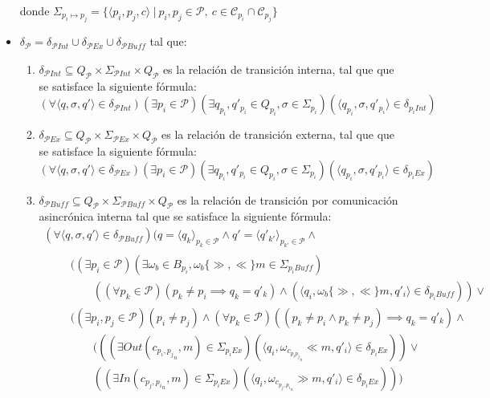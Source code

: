 \begin{definition}[Composición]
\begin{itemize}
donde $\Sigma_\mathit{p_i \mapsto p_j} =\{ \langle p_i,p_j,c \rangle \ | \ p_i, p_j \in \mathcal{P}, \  c \in \mathcal{C}_{p_i} \cap \mathcal{C}_{p_j}\}$
\item $\delta_{\mathcal{P}} = \delta_{\mathcal{P}\mathit{Int}} \cup \delta_{\mathcal{P}\mathit{Ex}} \cup \delta_{\mathcal{P}\mathit{Buff}}$ tal que:
\begin{enumerate}
\item $\delta_{\mathcal{P}\mathit{Int}} \subseteq Q_{\mathcal{P}} \times \Sigma_{\mathcal{P} Int} \times Q_{\mathcal{P}}$  es la relación de transición interna, tal que que se satisface la siguiente fórmula:
$$(\forall \langle q, \sigma, q' \rangle \in \delta_{\mathcal{P}\mathit{Int}})(\exists p_i \in \mathcal{P})(\exists q_{p_i}, q'_{p_i} \in Q_{p_i}, \sigma \in \Sigma_{p_i})(\langle q_{p_i}, \sigma, q'_{p_i} \rangle \in \delta_{p_i Int})$$

\item $\delta_{\mathcal{P}\mathit{Ex}} \subseteq Q_{\mathcal{P}} \times \Sigma_{\mathcal{P}\mathit{Ex}} \times Q_{\mathcal{P}}$ es la relación de transición externa, tal que que se satisface la siguiente fórmula: $$(\forall \langle q, \sigma, q' \rangle \in \delta_{\mathcal{P}\mathit{Ex}}) (\exists p_i \in \mathcal{P})(\exists q_{p_i},q'_{p_i} \in Q_{p_i}, \sigma \in \Sigma_{p_i}) (\langle q_{p_i},\sigma,q'_{p_i} \rangle \in \delta_{p_i Ex})$$

\item $\delta_{\mathcal{P}\mathit{Buff}} \subseteq Q_{\mathcal{P}} \times \Sigma_{\mathcal{P} \mathit{Buff}} \times Q_{\mathcal{P}}$ es la relación de transición por comunicación asincrónica interna tal que se satisface la siguiente fórmula:
$$
\begin{array}{l}
(\forall \langle q, \sigma, q' \rangle \in \delta_{\mathcal{P}\mathit{Buff}})(q = \langle q_k \rangle_{p_k \in \mathcal{P}} \land q' = \langle q'_{k'} \rangle_{p_{k'} \in \mathcal{P}} \land\\
\qquad
\begin{array}{l}
((\exists p_i \in \mathcal{P})(\exists \omega_b \in B_{p_i}, \omega_b \{\gg, \ll\} m \in \Sigma_{{p_i} \mathit{Buff}})\\
\qquad ((\forall p_k \in \mathcal{P})(p_k \neq p_i \implies q_k = q'_k) \land (\langle q_i, \omega_b \{\gg, \ll\} m, q'_i \rangle \in \delta_{p_i \mathit{Buff}}))\lor\\
((\exists p_i, p_j \in \mathcal{P})(p_i \neq p_j) \land (\forall p_k \in \mathcal{P})((p_k \neq p_i \land p_k \neq p_j) \implies q_k = q'_k) \land \\ \qquad (((\exists \mathit{Out}(c_{{p_i, p_j}_n}, m) \in \Sigma_{{p_i} \mathit{Ex}}) (\langle q_i, \omega_{c_{{p_i p_j}_n}} \ll m, q'_i \rangle \in \delta_{p_i  \mathit{Ex}})) \lor \\ \qquad ((\exists \mathit{In}(c_{p_j,{p_i}_n}, m) \in \Sigma_{{p_i} \mathit{Ex}})(\langle q_i,\omega_{c_{p_j,{p_i}_n}} \gg m, q'_i \rangle \in \delta_{p_i \mathit{Ex}})))  
\end{array}
\end{array}
 $$


\end{enumerate}
\end{itemize}
\end{definition}
